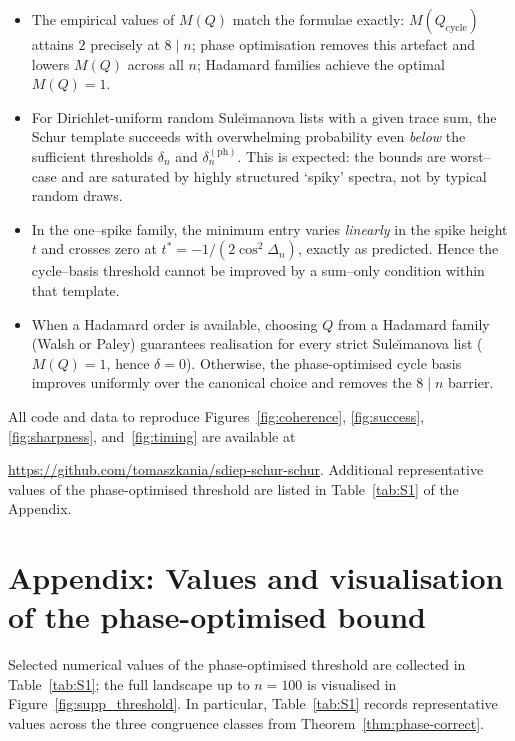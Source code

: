 \documentclass[12pt,fleqn]{amsart}
\theoremstyle{remark}
\newcommand{\1}{\mathbf{1}}
\begin{document}
\begin{itemize}
\item The empirical values of $M(Q)$ match the formulae exactly:
$M(Q_{\mathrm{cycle}})$ attains $2$ precisely at $8\mid n$; phase optimisation removes this
artefact and lowers $M(Q)$ across all $n$; Hadamard families achieve the optimal $M(Q)=1$.
\item For Dirichlet-uniform random Sule\u{\i}manova lists with a
given trace sum, the Schur template succeeds with overwhelming probability even
\emph{below} the sufficient thresholds $\delta_n$ and $\delta_n^{(\mathrm{ph})}$. This
is expected: the bounds are worst–case and are saturated by highly structured `spiky'
spectra, not by typical random draws.
\item In the one–spike family, the minimum entry varies
\emph{linearly} in the spike height $t$ and crosses zero at
$t^\ast=-1/(2\cos^2\Delta_n)$, exactly as predicted. Hence the cycle–basis threshold
cannot be improved by a sum–only condition within that template.
\item When a Hadamard order is available, choosing $Q$ from a
Hadamard family (Walsh or Paley) guarantees realisation for every strict
Sule\u{\i}manova list ($M(Q)=1$, hence $\delta=0$). Otherwise, the phase-optimised cycle basis
improves uniformly over the canonical choice and removes the $8\mid n$ barrier.
\end{itemize}

All code and data to reproduce Figures~\ref{fig:coherence}, \ref{fig:success}, \ref{fig:sharpness}, and~\ref{fig:timing}
are available at\newline

\url{https://github.com/tomaszkania/sdiep-schur-schur}. Additional representative values of the phase-optimised threshold are listed in Table~\ref{tab:S1} of the Appendix.

\clearpage
\appendix
\section*{Appendix: Values and visualisation of the phase-optimised bound}
\renewcommand{\thetable}{S\arabic{table}}
\setcounter{table}{0}

Selected numerical values of the phase-optimised threshold are collected in Table~\ref{tab:S1}; the full landscape up to $n=100$ is visualised in Figure~\ref{fig:supp_threshold}. In particular, Table~\ref{tab:S1} records representative values across the three congruence classes from Theorem~\ref{thm:phase-correct}.
\end{document}
